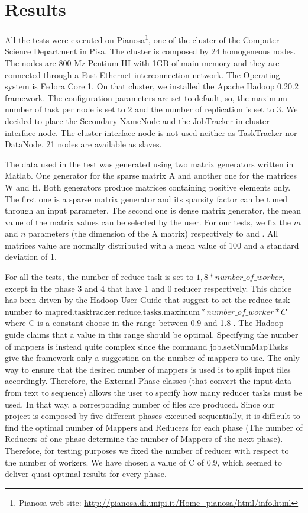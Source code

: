 \section{Results}
\label{sec:results}

 All the tests were executed on Pianosa\footnote{Pianosa web site: \url{http://pianosa.di.unipi.it/Home_pianosa/html/info.html}}, one of the cluster of the Computer Science Department in Pisa. The cluster is composed by 24 homogeneous nodes. The nodes are 800 Mz Pentium III with 1GB of main memory and they are connected through a Fast Ethernet interconnection network. The Operating system is Fedora Core 1. On that cluster, we installed the Apache Hadoop 0.20.2 framework. The configuration parameters are set to default, so, the maximum number of task per node is set to 2 and the number of replication is set to 3. 
We decided to place the Secondary NameNode and the JobTracker in cluster interface node.
The cluster interface node is not used neither as TaskTracker nor DataNode.
21 nodes are available as slaves.

The data used in the test was generated using two matrix generators written in Matlab.
One generator for the sparse matrix A and another one for the matrices W and H. 
Both generators produce matrices containing positive elements only.
The first one is a sparse matrix generator and its sparsity factor can be tuned through an input parameter. 
The second one is dense matrix generator, the mean value of the matrix values can be selected by the user. 
For our tests, we fix the $m$ and $n$ parameters (the dimension of the A matrix) respectively to  and .
All matrices value are normally distributed with a mean value of 100 and a standard deviation of 1.

For all the tests, the number of reduce task is set to $ 1,8 * number\_of\_worker$, except in the phase 3 and 4 that have 1 and 0 reducer respectively.
This choice has been driven by the Hadoop User Guide that suggest to set the reduce task number to 
$ \text{mapred.tasktracker.reduce.tasks.maximum} * number\_of\_worker * C $where C is a constant choose in the range between 0.9 and 1.8 \cite{numeroReducer}. 
The Hadoop guide claims that a value in this range should be optimal.
Specifying the number of mappers is instead quite complex since the command job.setNumMapTasks give the framework only a suggestion on the number of mappers to use.
The only way to ensure that the desired number of mappers is used is to split input files accordingly. 
Therefore, the External Phase classes (that convert the input data from text to sequence) allows the user to specify how many reducer tasks must be used. 
In that way, a corresponding number of files are produced.
Since our project is composed by five different phases executed sequentially, it is difficult to find the optimal number of Mappers and Reducers for each phase (The number of Reducers of one phase determine the number of Mappers of the next phase). 
Therefore, for testing purposes we fixed the number of reducer with respect to the number of workers.
We have chosen a value of C of 0.9, which seemed to deliver quasi optimal results for every phase.

